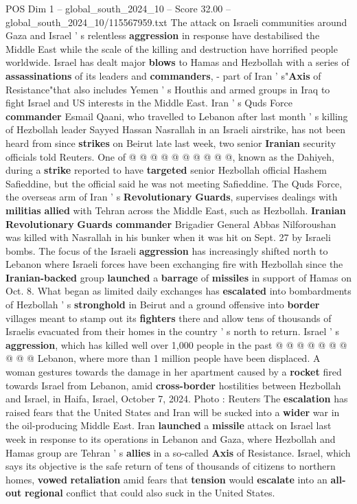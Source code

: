 \begin{textsample}{POS Dim 1 – global\_south\_2024\_10 – Score 32.00 – global\_south\_2024\_10/115567959.txt}
The attack on Israeli communities around Gaza and Israel ' s relentless \textbf{aggression} in response have destabilised the Middle East while the scale of the killing and destruction have horrified people worldwide.
Israel has dealt major \textbf{blows} to Hamas and Hezbollah with a series of \textbf{assassinations} of its leaders and \textbf{commanders}, - part of Iran ' s"\textbf{Axis} of Resistance"that also includes Yemen ' s Houthis and armed groups in Iraq to fight Israel and US interests in the Middle East.
Iran ' s Quds Force \textbf{commander} Esmail Qaani, who travelled to Lebanon after last month ' s killing of Hezbollah leader Sayyed Hassan Nasrallah in an Israeli airstrike, has not been heard from since \textbf{strikes} on Beirut late last week, two senior \textbf{Iranian} security officials told Reuters.
One of @ @ @ @ @ @ @ @ @ @, known as the Dahiyeh, during a \textbf{strike} reported to have \textbf{targeted} senior Hezbollah official Hashem Safieddine, but the official said he was not meeting Safieddine.
The Quds Force, the overseas arm of Iran ' s \textbf{Revolutionary} \textbf{Guards}, supervises dealings with \textbf{militias} \textbf{allied} with Tehran across the Middle East, such as Hezbollah. \textbf{Iranian} \textbf{Revolutionary} \textbf{Guards} \textbf{commander} Brigadier General Abbas Nilforoushan was killed with Nasrallah in his bunker when it was hit on Sept. 27 by Israeli bombs.
The focus of the Israeli \textbf{aggression} has increasingly shifted north to Lebanon where Israeli forces have been exchanging fire with Hezbollah since the \textbf{Iranian-backed} group \textbf{launched} a \textbf{barrage} of \textbf{missiles} in support of Hamas on Oct. 8.
What began as limited daily exchanges has \textbf{escalated} into bombardments of Hezbollah ' s \textbf{stronghold} in Beirut and a ground offensive into \textbf{border} villages meant to stamp out its \textbf{fighters} there and allow tens of thousands of Israelis evacuated from their homes in the country ' s north to return.
Israel ' s \textbf{aggression}, which has killed well over 1,000 people in the past @ @ @ @ @ @ @ @ @ @ Lebanon, where more than 1 million people have been displaced.
A woman gestures towards the damage in her apartment caused by a \textbf{rocket} fired towards Israel from Lebanon, amid \textbf{cross-border} hostilities between Hezbollah and Israel, in Haifa, Israel, October 7, 2024.
Photo : Reuters The \textbf{escalation} has raised fears that the United States and Iran will be sucked into a \textbf{wider} war in the oil-producing Middle East.
Iran \textbf{launched} a \textbf{missile} attack on Israel last week in response to its operations in Lebanon and Gaza, where Hezbollah and Hamas group are Tehran ' s \textbf{allies} in a so-called \textbf{Axis} of Resistance.
Israel, which says its objective is the safe return of tens of thousands of citizens to northern homes, \textbf{vowed} \textbf{retaliation} amid fears that \textbf{tension} would \textbf{escalate} into an \textbf{all-out} \textbf{regional} conflict that could also suck in the United States.


\end{textsample}
